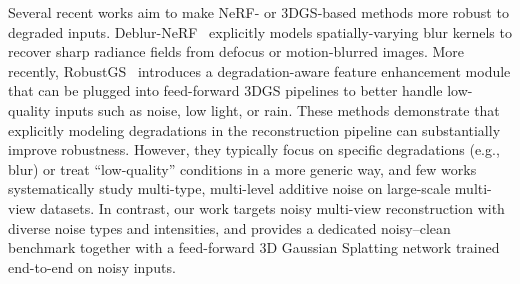 Several recent works aim to make NeRF- or 3DGS-based methods more robust to degraded inputs. 
Deblur-NeRF~\cite{ma2022deblurnerf} explicitly models spatially-varying blur kernels to recover sharp radiance fields from defocus or motion-blurred images. 
More recently, RobustGS~\cite{wu2025robustgs} introduces a degradation-aware feature enhancement module that can be plugged into feed-forward 3DGS pipelines to better handle low-quality inputs such as noise, low light, or rain. 
These methods demonstrate that explicitly modeling degradations in the reconstruction pipeline can substantially improve robustness. 
However, they typically focus on specific degradations (e.g., blur) or treat ``low-quality'' conditions in a more generic way, 
and few works systematically study multi-type, multi-level additive noise on large-scale multi-view datasets. 
In contrast, our work targets noisy multi-view reconstruction with diverse noise types and intensities, 
and provides a dedicated noisy--clean benchmark together with a feed-forward 3D Gaussian Splatting network trained end-to-end on noisy inputs.


